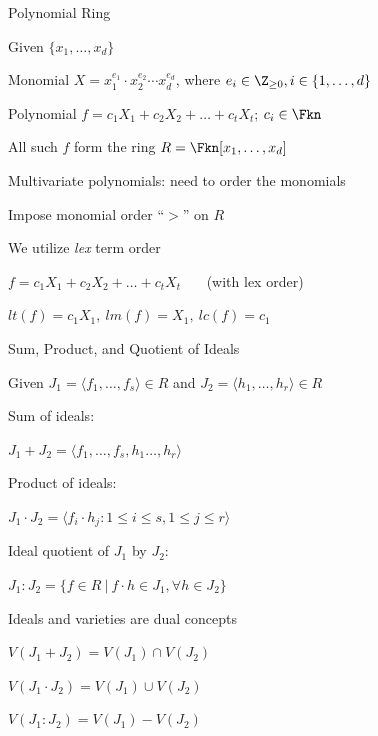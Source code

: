 \begin{frame}{\large Polynomial Ring}
\bi
	\item Given $\{x_1,\dots,x_d\}$
	\bi
		\item Monomial $X = x_1^{e_{1}}\cdot x_2^{e_{2}}\cdots x_d^{e_{d}}$, where $e_i \in \Z_{\geq 0}, i\in \{1, \dots,d\}$
		\item Polynomial $f = c_1 X_1 + c_2 X_2 + \dots + c_t X_t$; $c_i \in \Fkn$
	\ei
	\item All such $f$ form the ring $R = \Fkn[x_1,\dots,x_d]$
	\vspace{0.1in}
	\item Multivariate polynomials: need to order the monomials
	\vspace{0.1in}
	\item Impose monomial order ``$>$'' on $R$
	\bi
		\item We utilize \alert{{\it lex}} term order
	\ei
	\vspace{0.1in}
	\item $f = c_1 X_1 + c_2 X_2 + \dots + c_t X_t$  ~~~(with lex order)
	\bi
		\item $lt(f) = c_1 X_1, ~lm(f) = X_1, ~lc(f) = c_1$
	\ei
\ei
\end{frame}

\begin{frame}{\large Sum, Product, and Quotient of Ideals}
\begin{center}
Given $J_1 = \langle f_1,\dots,f_s\rangle \in R$ and $J_2=\langle h_1,\dots,h_r\rangle \in R$
\end{center}
\bi 
\item Sum of ideals:
\bi
	\item $J_1 + J_2 = \langle f_1,\dots,f_s, h_1\dots,h_r\rangle$
\ei
\item Product of ideals:
\bi
\item $J_1\cdot J_2 = \langle f_i\cdot h_j: 1\leq i\leq s, 1\leq j\leq r\rangle$
\ei

\item Ideal quotient of $J_1$ by $J_2$:
\bi
\item $J_1:J_2 = \{f \in R \ |\ f\cdot h \in J_1, \forall h \in J_2\}$
\ei

\item Ideals and varieties are dual concepts
\bi
\item $V(J_1 + J_2) = V(J_1) \cap V(J_2)$
\item $V(J_1\cdot J_2) = V(J_1) \cup V(J_2)$
\item $V(J_1:J_2) = V(J_1)-V(J_2)$
\ei
\ei

\end{frame}

